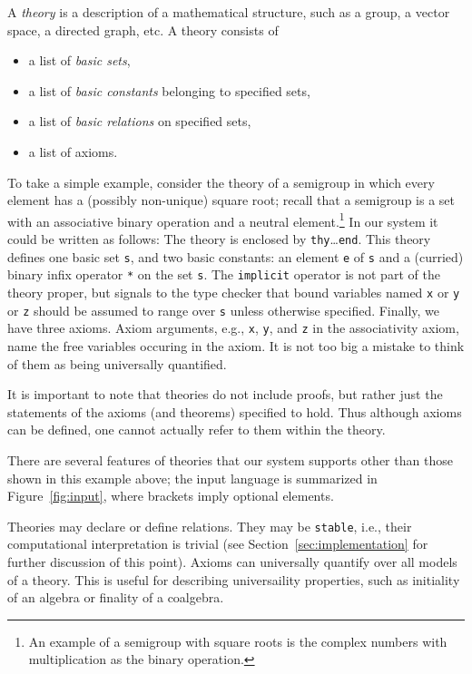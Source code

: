A \emph{theory} is a description of a mathematical structure, such as
a group, a vector space, a directed graph, etc. A theory consists of
%
\begin{itemize}
\item a list of \emph{basic sets},
\item a list of \emph{basic constants} belonging to specified sets,
\item a list of \emph{basic relations} on specified sets,
\item a list of axioms.
\end{itemize}
%
To take a simple example, consider the theory of a semigroup in which
every element has a (possibly non-unique) square root; recall that a
semigroup is a set with an associative binary operation and a neutral
element.\footnote{An example of a semigroup with square roots is the
  complex numbers with multiplication as the binary operation.} In our
system it could be written as follows:
%
%
The theory is enclosed by \Verb|thy|\ldots\Verb|end|. This theory
defines one basic set \Verb|s|, and two basic constants: an element
\Verb|e| of \Verb|s| and a (curried) binary infix operator \Verb|*| on
the set \Verb|s|. The \Verb|implicit| operator is not part of the
theory proper, but signals to the type checker that bound
variables named \Verb|x| or \Verb|y| or \Verb|z| should be assumed to
range over \Verb|s| unless otherwise specified. Finally,
we have three axioms. Axiom arguments, e.g., \Verb|x|, \Verb|y|, and
\Verb|z| in the associativity axiom, name the free variables occuring
in the axiom. It is not too big a mistake to think of them as being
universally quantified.

It is important to note that theories do not include proofs, but
rather just the statements of the axioms (and theorems) specified to
hold. Thus although axioms can be defined, one cannot actually refer
to them within the theory.

There are several features of theories that our system supports other
than those shown in this example above; the input language is
summarized in Figure~\ref{fig:input}, where brackets imply optional
elements.


Theories may declare or define relations.  They may be \Verb|stable|,
i.e., their computational interpretation is trivial (see
Section~\ref{sec:implementation} for further discussion of this point).
Axioms can universally quantify over all models of a theory.
  This is useful for describing universaility properties, such as
  initiality of an algebra or finality of a coalgebra.
  
